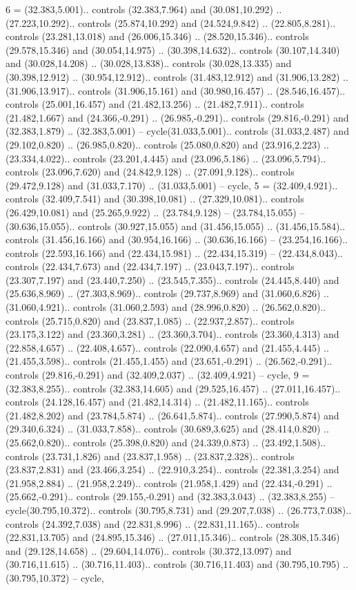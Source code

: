 {6} = {(32.383,5.001).. controls (32.383,7.964) and (30.081,10.292) .. (27.223,10.292).. controls (25.874,10.292) and (24.524,9.842) .. (22.805,8.281).. controls (23.281,13.018) and (26.006,15.346) .. (28.520,15.346).. controls (29.578,15.346) and (30.054,14.975) .. (30.398,14.632).. controls (30.107,14.340) and (30.028,14.208) .. (30.028,13.838).. controls (30.028,13.335) and (30.398,12.912) .. (30.954,12.912).. controls (31.483,12.912) and (31.906,13.282) .. (31.906,13.917).. controls (31.906,15.161) and (30.980,16.457) .. (28.546,16.457).. controls (25.001,16.457) and (21.482,13.256) .. (21.482,7.911).. controls (21.482,1.667) and (24.366,-0.291) .. (26.985,-0.291).. controls (29.816,-0.291) and (32.383,1.879) .. (32.383,5.001) -- cycle(31.033,5.001).. controls (31.033,2.487) and (29.102,0.820) .. (26.985,0.820).. controls (25.080,0.820) and (23.916,2.223) .. (23.334,4.022).. controls (23.201,4.445) and (23.096,5.186) .. (23.096,5.794).. controls (23.096,7.620) and (24.842,9.128) .. (27.091,9.128).. controls (29.472,9.128) and (31.033,7.170) .. (31.033,5.001) -- cycle},
{5} = {(32.409,4.921).. controls (32.409,7.541) and (30.398,10.081) .. (27.329,10.081).. controls (26.429,10.081) and (25.265,9.922) .. (23.784,9.128) -- (23.784,15.055) -- (30.636,15.055).. controls (30.927,15.055) and (31.456,15.055) .. (31.456,15.584).. controls (31.456,16.166) and (30.954,16.166) .. (30.636,16.166) -- (23.254,16.166).. controls (22.593,16.166) and (22.434,15.981) .. (22.434,15.319) -- (22.434,8.043).. controls (22.434,7.673) and (22.434,7.197) .. (23.043,7.197).. controls (23.307,7.197) and (23.440,7.250) .. (23.545,7.355).. controls (24.445,8.440) and (25.636,8.969) .. (27.303,8.969).. controls (29.737,8.969) and (31.060,6.826) .. (31.060,4.921).. controls (31.060,2.593) and (28.996,0.820) .. (26.562,0.820).. controls (25.715,0.820) and (23.837,1.085) .. (22.937,2.857).. controls (23.175,3.122) and (23.360,3.281) .. (23.360,3.704).. controls (23.360,4.313) and (22.858,4.657) .. (22.408,4.657).. controls (22.090,4.657) and (21.455,4.445) .. (21.455,3.598).. controls (21.455,1.455) and (23.651,-0.291) .. (26.562,-0.291).. controls (29.816,-0.291) and (32.409,2.037) .. (32.409,4.921) -- cycle},
{9} = {(32.383,8.255).. controls (32.383,14.605) and (29.525,16.457) .. (27.011,16.457).. controls (24.128,16.457) and (21.482,14.314) .. (21.482,11.165).. controls (21.482,8.202) and (23.784,5.874) .. (26.641,5.874).. controls (27.990,5.874) and (29.340,6.324) .. (31.033,7.858).. controls (30.689,3.625) and (28.414,0.820) .. (25.662,0.820).. controls (25.398,0.820) and (24.339,0.873) .. (23.492,1.508).. controls (23.731,1.826) and (23.837,1.958) .. (23.837,2.328).. controls (23.837,2.831) and (23.466,3.254) .. (22.910,3.254).. controls (22.381,3.254) and (21.958,2.884) .. (21.958,2.249).. controls (21.958,1.429) and (22.434,-0.291) .. (25.662,-0.291).. controls (29.155,-0.291) and (32.383,3.043) .. (32.383,8.255) -- cycle(30.795,10.372).. controls (30.795,8.731) and (29.207,7.038) .. (26.773,7.038).. controls (24.392,7.038) and (22.831,8.996) .. (22.831,11.165).. controls (22.831,13.705) and (24.895,15.346) .. (27.011,15.346).. controls (28.308,15.346) and (29.128,14.658) .. (29.604,14.076).. controls (30.372,13.097) and (30.716,11.615) .. (30.716,11.403).. controls (30.716,11.403) and (30.795,10.795) .. (30.795,10.372) -- cycle},
